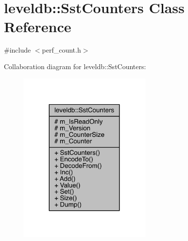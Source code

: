 \hypertarget{classleveldb_1_1_sst_counters}{}\section{leveldb\+:\+:Sst\+Counters Class Reference}
\label{classleveldb_1_1_sst_counters}


{\ttfamily \#include $<$perf\+\_\+count.\+h$>$}



Collaboration diagram for leveldb\+:\+:Sst\+Counters\+:\nopagebreak
\begin{figure}[H]
\begin{center}
\leavevmode
\includegraphics[width=188pt]{classleveldb_1_1_sst_counters__coll__graph}
\end{center}
\end{figure}
